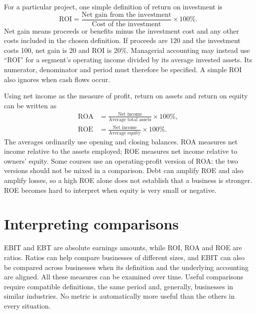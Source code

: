 \documentclass[12pt,a4paper]{report}
\begin{document}
For a particular project, one simple definition of return on investment is
\begin{equation*}
\text{ROI}=\frac{\text{Net gain from the investment}}{\text{Cost of the investment}}\times100\%.
\end{equation*}
Net gain means proceeds or benefits minus the investment cost and any other costs included in the chosen definition. If proceeds are 120 and the investment costs 100, net gain is 20 and ROI is 20\%. Managerial accounting may instead use ``ROI'' for a segment's operating income divided by its average invested assets. Its numerator, denominator and period must therefore be specified. A simple ROI also ignores when cash flows occur.

Using net income as the measure of profit, return on assets and return on equity can be written as
\begin{align*}
\text{ROA}&=\frac{\text{Net income}}{\text{Average total assets}}\times100\%,\\
\text{ROE}&=\frac{\text{Net income}}{\text{Average equity}}\times100\%.
\end{align*}
The averages ordinarily use opening and closing balances. ROA measures net income relative to the assets employed; ROE measures net income relative to owners' equity. Some courses use an operating-profit version of ROA: the two versions should not be mixed in a comparison. Debt can amplify ROE and also amplify losses, so a high ROE alone does not establish that a business is stronger. ROE becomes hard to interpret when equity is very small or negative.

\section{Interpreting comparisons}

EBIT and EBT are absolute earnings amounts, while ROI, ROA and ROE are ratios. Ratios can help compare businesses of different sizes, and EBIT can also be compared across businesses when its definition and the underlying accounting are aligned. All these measures can be examined over time. Useful comparisons require compatible definitions, the same period and, generally, businesses in similar industries. No metric is automatically more useful than the others in every situation.
\end{document}
